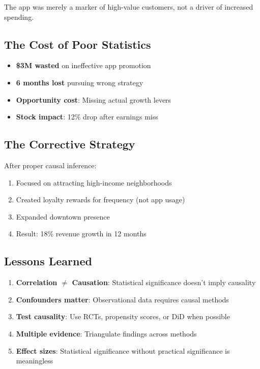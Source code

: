 The app was merely a marker of high-value customers, not a driver of increased spending.

\subsection{The Cost of Poor Statistics}

\begin{itemize}
    \item \textbf{\$3M wasted} on ineffective app promotion
    \item \textbf{6 months lost} pursuing wrong strategy
    \item \textbf{Opportunity cost}: Missing actual growth levers
    \item \textbf{Stock impact}: 12\% drop after earnings miss
\end{itemize}

\subsection{The Corrective Strategy}

After proper causal inference:

\begin{enumerate}
    \item Focused on attracting high-income neighborhoods
    \item Created loyalty rewards for frequency (not app usage)
    \item Expanded downtown presence
    \item Result: 18\% revenue growth in 12 months
\end{enumerate}

\subsection{Lessons Learned}

\begin{enumerate}
    \item \textbf{Correlation $\neq$ Causation}: Statistical significance doesn't imply causality
    \item \textbf{Confounders matter}: Observational data requires causal methods
    \item \textbf{Test causality}: Use RCTs, propensity scores, or DiD when possible
    \item \textbf{Multiple evidence}: Triangulate findings across methods
    \item \textbf{Effect sizes}: Statistical significance without practical significance is meaningless
\end{enumerate}

